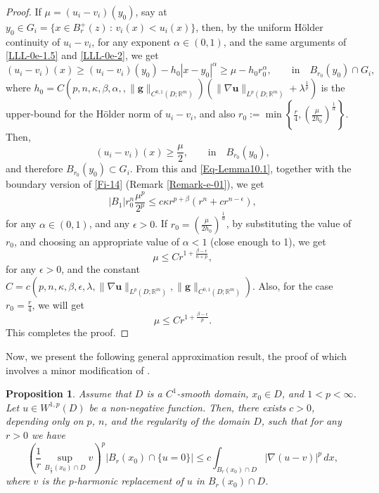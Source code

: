 \documentclass{amsart}
\newtheorem{proposition}[theorem]{Proposition}
\begin{document}
\begin{proof}
If $ \mu=(u_i-v_i)(y_0)$, say at $y_0 \in G_i=\{ x \in B_{r}^+(z) \, : \, v_i(x) < u_i(x)\}$, then, by the uniform H\"older continuity of $u_i-v_i$, for any exponent $\alpha \in (0,1)$, and the same arguments of \eqref{LLL-0e-1.5} and \eqref{LLL-0e-2}, we get
$$ 
(u_i-v_i)(x) \geq (u_i-v_i)(y_0) - h_0|x-y_0|^{\alpha} \geq \mu - h_0 r_0^{\alpha}, \qquad \text{in} \quad B_{r_0}(y_0) \cap G_i,
$$
where $h_0 = C(p, n, \kappa, \beta, \alpha,, \|\mathbf{g}\|_{C^{0,1}(D; \mathbb{R}^m)}) \left( \| \nabla \mathbf{u} \|_{L^p\left(D; \mathbb{R}^m\right)} + \lambda^{\frac{1}{p}} \right)$ is the upper-bound for the H\"older norm of $u_i-v_i$, and
also $r_0:=\min \left\{ \frac r4, \left(\frac\mu {2h_0} \right)^{\frac1\alpha} \right\}$.
Then, 
$$ (u_i-v_i)(x) \geq \frac{\mu}{2}, \qquad \text{in} \quad B_{r_0}(y_0), $$
and therefore $B_{r_0}(y_0) \subset G_i$.
From this and \eqref{Eq-Lemma10.1}, together with the boundary version of \eqref{Fi-14} (Remark \ref{Remark-e-01}), we get 
$$ |B_1| r_0^n \frac{\mu^p}{2^p} \leq c \kappa r^{p+\beta} \left( r^n+ c  r^{n-\epsilon} \right), $$ 
for any $\alpha \in (0,1)$, and any $\epsilon >0$.
If $r_0= \left(\frac\mu {2h_0} \right)^{\frac1\alpha}$, by substituting the value of $r_0$, and choosing an appropriate value of $\alpha< 1$ (close enough to 1), we get
$$
\mu \leq C  r^{1+\frac{\beta-\epsilon}{n+p}},
$$
for any $\epsilon >0$, and the constant $C=c(p, n, \kappa, \beta, \epsilon, \lambda,  \| \nabla \mathbf{u} \|_{L^p(D; \mathbb{R}^m)}, \|\mathbf{g}\|_{C^{0,1}(D; \mathbb{R}^m)})$. 
Also, for the case $r_0= \frac r4$, we will get
\[
\mu \le C r^{1+\frac{\beta-\epsilon} p}.
\]
This completes the proof.
\end{proof}

Now, we present the following general approximation result, the proof of which involves a minor modification of 
\cite[Lemma 2.5]{fotouhi2023weakly}.

\begin{proposition}
\label{Lemma2.5}
Assume that $D$ is a %
$C^1$-smooth domain, $x_0\in D$, and $1<p<\infty$. Let $u \in W^{1,p}(D)$ be a non-negative function. Then, there exists $c>0$, depending only on $p$, $n$, and the regularity of the domain $D$, such that for any $r>0$ we have
\begin{equation}
\label{LLL-e-0}
\left( \frac{1}{r} \sup_{B_{\frac{r}{2}}(x_0) \cap D} v \right)^p \left| B_r(x_0) \cap \{ u =0 \}  \right| \leq c \int_{B_r(x_0) \cap D} | \nabla (u-v)|^p \, dx,
\end{equation}
where $v$ is the $p$-harmonic replacement of $u$ in $B_r(x_0) \cap D$.
\end{proposition}
\end{document}
